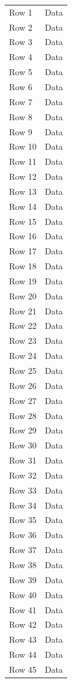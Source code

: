 \documentclass[Journal,LineNumbers]{ascelike-new}
\begin{document}
\begin{longtable}{ll}
Row 1  & Data\\
Row 2  & Data\\
Row 3  & Data\\
Row 4  & Data\\
Row 5  & Data\\
Row 6  & Data\\
Row 7  & Data\\
Row 8  & Data\\
Row 9  & Data\\
Row 10 & Data\\
Row 11 & Data\\
Row 12 & Data\\
Row 13 & Data\\
Row 14 & Data\\
Row 15 & Data\\
Row 16 & Data\\
Row 17 & Data\\
Row 18 & Data\\
Row 19 & Data\\
Row 20 & Data\\
Row 21 & Data\\
Row 22 & Data\\
Row 23 & Data\\
Row 24 & Data\\
Row 25 & Data\\
Row 26 & Data\\
Row 27 & Data\\
Row 28 & Data\\
Row 29 & Data\\
Row 30 & Data\\
Row 31 & Data\\
Row 32 & Data\\
Row 33 & Data\\
Row 34 & Data\\
Row 35 & Data\\
Row 36 & Data\\
Row 37 & Data\\
Row 38 & Data\\
Row 39 & Data\\
Row 40 & Data\\
Row 41 & Data\\
Row 42 & Data\\
Row 43 & Data\\
Row 44 & Data\\
Row 45 & Data\\

\end{longtable}
\end{document}
